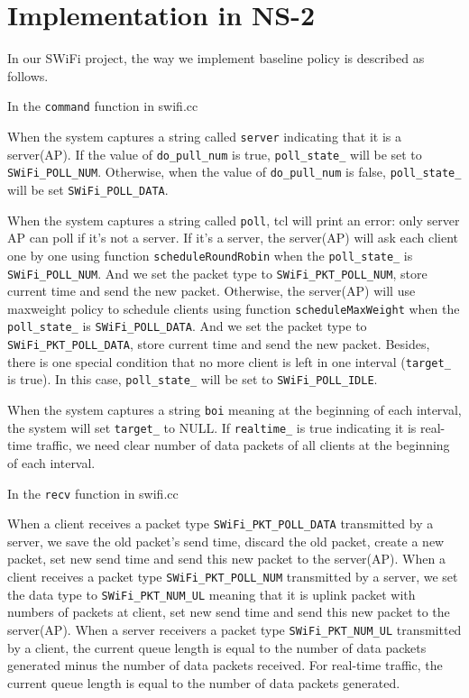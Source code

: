 \documentclass{article}
\begin{document}
\section{Implementation in NS-2}
\label{section: ns2}
In our SWiFi project, the way we implement baseline policy is described as follows. 

In the \lstinline |command| function in swifi.cc

When the system captures a string called  \lstinline |server| indicating that it is a server(AP). If the value of  \lstinline |do_pull_num|  is true,  \lstinline |poll_state_|  will be set to  \lstinline |SWiFi_POLL_NUM|. Otherwise, when the value of  \lstinline |do_pull_num|  is false,   \lstinline |poll_state_|  will be set  \lstinline |SWiFi_POLL_DATA|. 


When the system captures a string called  \lstinline |poll|, tcl will print an error: only server AP can poll if it's not a server. If it's a server, the server(AP) will ask each client one by one using function \lstinline |scheduleRoundRobin| when the \lstinline |poll_state_| is  \lstinline |SWiFi_POLL_NUM|. And we set the packet type to \lstinline |SWiFi_PKT_POLL_NUM|, store current time and send the new packet. Otherwise, the server(AP) will use maxweight policy to schedule clients using function \lstinline |scheduleMaxWeight| when the \lstinline |poll_state_| is  \lstinline |SWiFi_POLL_DATA|. And we set the packet type to \lstinline |SWiFi_PKT_POLL_DATA|, store current time and send the new packet. Besides, there is one special condition that no more client is left in one interval (\lstinline |target_| is true). In this case, \lstinline |poll_state_| will be set to \lstinline |SWiFi_POLL_IDLE|.


When the system captures a string \lstinline |boi| meaning at the beginning of each interval, the system will set \lstinline |target_| to NULL. If  \lstinline |realtime_|  is true indicating it is real-time traffic, we need clear number of data packets of all clients at the beginning of each interval. 

In the  \lstinline |recv| function in swifi.cc

When a client receives a packet type \lstinline |SWiFi_PKT_POLL_DATA| transmitted by a server, we save the old packet's send time, discard the old packet, create a new packet, set new send time and send this new packet to the server(AP). 
When a client receives a packet type \lstinline |SWiFi_PKT_POLL_NUM| transmitted by a server, we set the data type to \lstinline |SWiFi_PKT_NUM_UL| meaning that it is uplink packet with numbers of packets at client, set new send time and send this new packet to the server(AP).
When a server receivers  a packet type \lstinline |SWiFi_PKT_NUM_UL| transmitted by a client, the current queue length is equal to the number of data packets generated minus the number of data packets received. For real-time traffic, the current queue length is equal to the number of data packets generated.  
\end{document}
